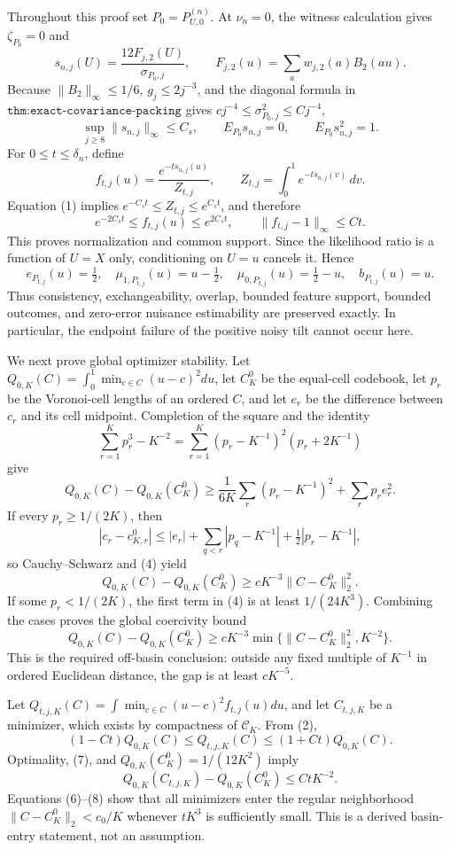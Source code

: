 Throughout this proof set \(P_0=P_{U,0}^{(n)}\).  At \(\nu_n=0\), the witness calculation gives \(\zeta_{P_0}=0\) and
\[
 s_{n,j}(U)=\frac{12F_{j,2}(U)}{\sigma_{P_0,j}},\qquad
 F_{j,2}(u)=\sum_aw_{j,2}(a)B_2(au).
\]
Because \(\|B_2\|_\infty\leq1/6\), \(g_j\leq2j^{-3}\), and the diagonal formula in \(\texttt{thm:exact-covariance-packing}\) gives \(c j^{-4}\leq\sigma_{P_0,j}^2\leq Cj^{-4}\),
\[
 \sup_{j\geq8}\|s_{n,j}\|_\infty\leq C_s,\qquad
 E_{P_0}s_{n,j}=0,\qquad E_{P_0}s_{n,j}^2=1. \tag{1}
\]
For \(0\leq t\leq\delta_n\), define
\[
 f_{t,j}(u)=\frac{e^{-t s_{n,j}(u)}}{Z_{t,j}},\qquad
 Z_{t,j}=\int_0^1e^{-t s_{n,j}(v)}\,dv.
\]
Equation (1) implies \(e^{-C_st}\leq Z_{t,j}\leq e^{C_st}\), and therefore
\[
 e^{-2C_st}\leq f_{t,j}(u)\leq e^{2C_st},\qquad
 \|f_{t,j}-1\|_\infty\leq C t. \tag{2}
\]
This proves normalization and common support.  Since the likelihood ratio is a function of \(U=X\) only, conditioning on \(U=u\) cancels it.  Hence
\[
 e_{P_{t,j}}(u)=\tfrac12,\quad
 \mu_{1,P_{t,j}}(u)=u-\tfrac12,\quad
 \mu_{0,P_{t,j}}(u)=\tfrac12-u,\quad b_{P_{t,j}}(u)=u. \tag{3}
\]
Thus consistency, exchangeability, overlap, bounded feature support, bounded outcomes, and zero-error nuisance estimability are preserved exactly.  In particular, the endpoint failure of the positive noisy tilt cannot occur here.

We next prove global optimizer stability.  Let \(Q_{0,K}(C)=\int_0^1\min_{c\in C}(u-c)^2du\), let \(C_K^0\) be the equal-cell codebook, let \(p_r\) be the Voronoi-cell lengths of an ordered \(C\), and let \(e_r\) be the difference between \(c_r\) and its cell midpoint.  Completion of the square and the identity
\[
 \sum_{r=1}^Kp_r^3-K^{-2}
 =\sum_{r=1}^K(p_r-K^{-1})^2(p_r+2K^{-1})
\]
give
\[
 Q_{0,K}(C)-Q_{0,K}(C_K^0)
 \geq\frac1{6K}\sum_r(p_r-K^{-1})^2+\sum_rp_re_r^2. \tag{4}
\]
If every \(p_r\geq1/(2K)\), then
\[
 |c_r-c_{K,r}^0|
 \leq |e_r|+\sum_{q<r}|p_q-K^{-1}|+\tfrac12|p_r-K^{-1}|,
\]
so Cauchy--Schwarz and (4) yield
\[
 Q_{0,K}(C)-Q_{0,K}(C_K^0)\geq cK^{-3}\|C-C_K^0\|_2^2. \tag{5}
\]
If some \(p_r<1/(2K)\), the first term in (4) is at least \(1/(24K^3)\).  Combining the cases proves the global coercivity bound
\[
 Q_{0,K}(C)-Q_{0,K}(C_K^0)
 \geq cK^{-3}\min\{\|C-C_K^0\|_2^2,K^{-2}\}. \tag{6}
\]
This is the required off-basin conclusion: outside any fixed multiple of \(K^{-1}\) in ordered Euclidean distance, the gap is at least \(cK^{-5}\).

Let \(Q_{t,j,K}(C)=\int\min_{c\in C}(u-c)^2f_{t,j}(u)du\), and let \(C_{t,j,K}\) be a minimizer, which exists by compactness of \(\mathcal C_K\).  From (2),
\[
 (1-Ct)Q_{0,K}(C)\leq Q_{t,j,K}(C)\leq(1+Ct)Q_{0,K}(C). \tag{7}
\]
Optimality, (7), and \(Q_{0,K}(C_K^0)=1/(12K^2)\) imply
\[
 Q_{0,K}(C_{t,j,K})-Q_{0,K}(C_K^0)\leq CtK^{-2}. \tag{8}
\]
Equations (6)--(8) show that all minimizers enter the regular neighborhood \(\|C-C_K^0\|_2<c_0/K\) whenever \(tK^3\) is sufficiently small.  This is a derived basin-entry statement, not an assumption.

